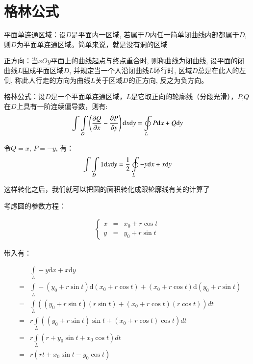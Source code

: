 \section{格林公式}

平面单连通区域：设$D$是平面内一区域, 若属于$D$内任一简单闭曲线内部都属于$D$, 则$D$为平面单连通区域。简单来说，就是没有洞的区域\par
正方向：当$xOy$平面上的曲线起点与终点重合时, 则称曲线为闭曲线, 设平面的闭曲线$L$围成平面区域$D$, 并规定当一个人沿闭曲线$L$环行时, 区域$D$总是在此人的左侧, 称此人行走的方向为曲线$L$关于区域$D$的正方向, 反之为负方向。\par
格林公式：设$D$是一个平面单连通区域，$L$是它取正向的轮廓线（分段光滑），$P$,$Q$在$D$上具有一阶连续偏导数，则有:
\begin{eqnarray*}
\int\int\limits_D\left({\partial Q\over \partial x}-{\partial P\over \partial y}\right)\mathrm dx\mathrm dy=\oint\limits_LP\mathrm dx+Q\mathrm dy
\end{eqnarray*}

令$Q = x$, $P = -y$, 有：
\begin{eqnarray*}
\int\int\limits_D1\mathrm dx\mathrm dy={1\over 2}\oint\limits_L-y\mathrm dx+x\mathrm dy
\end{eqnarray*}

这样转化之后，我们就可以把圆的面积转化成跟轮廓线有关的计算了\par
考虑圆的参数方程：

\begin{eqnarray*}
\left\{
\begin{array}{cccc}
x &=& x_0 + r \cos t \\
y &=& y_0 + r \sin t
\end{array}
\right.
\end{eqnarray*}

带入有：


\begin{eqnarray*}
&& \int\limits_L-y\mathrm dx+x\mathrm dy \\
&=&\int\limits_L-(y_0+r\sin t)\mathrm d(x_0+r\cos t)+(x_0+r\cos t)\mathrm d(y_0+r\sin t)\\
&=&\int\limits_L((y_0+r\sin t)(r\sin t)+(x_0+r\cos t)(r\cos t)) dt\\
&=&r\int\limits_L((y_0+r\sin t)\sin t+(x_0+r\cos t)\cos t) dt\\
&=&r\int\limits_L (r+y_0\sin t+x_0\cos t) dt\\
&=&r(rt+x_0\sin t-y_0\cos t)
\end{eqnarray*}

